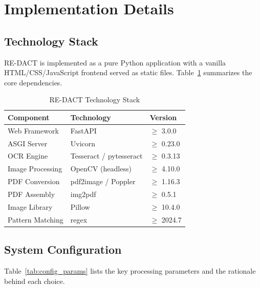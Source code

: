 \documentclass[conference]{IEEEtran}
\begin{document}
\section{Implementation Details}

\subsection{Technology Stack}
RE-DACT is implemented as a pure Python application with a vanilla HTML/CSS/JavaScript frontend served as static files. Table~\ref{tab:tech_stack} summarizes the core dependencies.

\begin{table}[htbp]
\caption{RE-DACT Technology Stack}
\label{tab:tech_stack}
\centering
\begin{tabular}{@{}lll@{}}
\toprule
\textbf{Component} & \textbf{Technology} & \textbf{Version} \\
\midrule
Web Framework    & FastAPI        & $\geq$ 3.0.0 \\
ASGI Server      & Uvicorn        & $\geq$ 0.23.0 \\
OCR Engine       & Tesseract / pytesseract & $\geq$ 0.3.13 \\
Image Processing & OpenCV (headless) & $\geq$ 4.10.0 \\
PDF Conversion   & pdf2image / Poppler & $\geq$ 1.16.3 \\
PDF Assembly     & img2pdf        & $\geq$ 0.5.1 \\
Image Library    & Pillow         & $\geq$ 10.4.0 \\
Pattern Matching & regex          & $\geq$ 2024.7 \\
\bottomrule
\end{tabular}
\end{table}

\subsection{System Configuration}
Table~\ref{tab:config_params} lists the key processing parameters and the rationale behind each choice.
\end{document}
